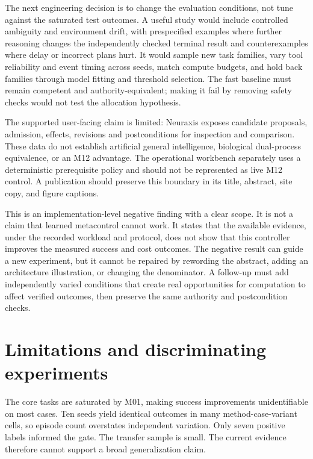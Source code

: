 \documentclass[11pt]{article}
\begin{document}
The next engineering decision is to change the evaluation conditions, not tune against the saturated test outcomes. A useful study would include controlled ambiguity and environment drift, with prespecified examples where further reasoning changes the independently checked terminal result and counterexamples where delay or incorrect plans hurt. It would sample new task families, vary tool reliability and event timing across seeds, match compute budgets, and hold back families through model fitting and threshold selection. The fast baseline must remain competent and authority-equivalent; making it fail by removing safety checks would not test the allocation hypothesis.

The supported user-facing claim is limited: Neuraxis exposes candidate proposals, admission, effects, revisions and postconditions for inspection and comparison. These data do not establish artificial general intelligence, biological dual-process equivalence, or an M12 advantage. The operational workbench separately uses a deterministic prerequisite policy and should not be represented as live M12 control. A publication should preserve this boundary in its title, abstract, site copy, and figure captions.

This is an implementation-level negative finding with a clear scope. It is not a claim that learned metacontrol cannot work. It states that the available evidence, under the recorded workload and protocol, does not show that this controller improves the measured success and cost outcomes. The negative result can guide a new experiment, but it cannot be repaired by rewording the abstract, adding an architecture illustration, or changing the denominator. A follow-up must add independently varied conditions that create real opportunities for computation to affect verified outcomes, then preserve the same authority and postcondition checks.


\section{Limitations and discriminating experiments}
The core tasks are saturated by M01, making success improvements unidentifiable on most cases. Ten seeds yield identical outcomes in many method-case-variant cells, so episode count overstates independent variation. Only seven positive labels informed the gate. The transfer sample is small. The current evidence therefore cannot support a broad generalization claim.
\end{document}
